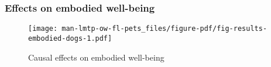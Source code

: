 \documentclass[
  singlecolumn,
  9pt]{article}
\begin{document}
\subsubsection{Effects on embodied
well-being}\label{effects-on-embodied-well-being-1}

\begin{figure}

{\centering \texttt{[image: man-lmtp-ow-fl-pets\_files/figure-pdf/fig-results-embodied-dogs-1.pdf]}

}

\caption{\label{fig-results-embodied-dogs}Causal effects on embodied
well-being}

\end{figure}

\newpage{}

\hypertarget{tbl-results-embodied-dogs}{}
\end{document}
